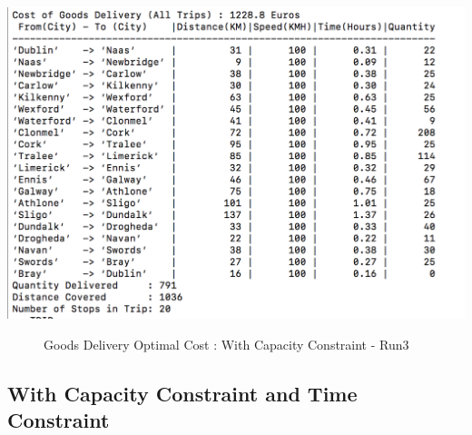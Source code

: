 \documentclass[a4paper&11pt]{article}
\begin{document}
\begin{center}
\includegraphics[scale=0.8]{20fig3.png}
\begin{figure}[H]
\caption{Goods Delivery Optimal Cost :  With Capacity Constraint - Run3}
\end{figure}
\end{center}

\subsection*{With Capacity Constraint and Time Constraint}
\end{document}
